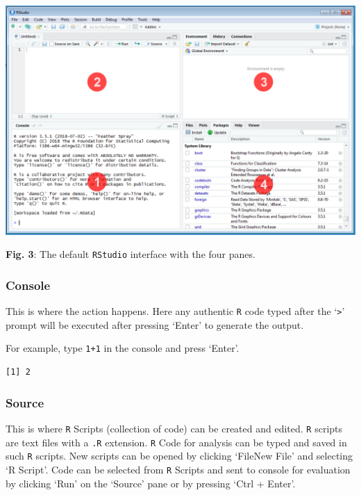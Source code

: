 \includegraphics{rstudio panes.png}

\begin{center}
                \textbf{Fig. 3}: The default \texttt{RStudio} interface with the four panes.
                \end{center}

\hypertarget{console}{%
\subsubsection{Console}\label{console}}

This is where the action happens. Here any authentic \texttt{R} code
typed after the `\texttt{\textgreater{}}' prompt will be executed after
pressing `Enter' to generate the output.

For example, type \texttt{1+1} in the console and press `Enter'.

\begin{Shaded}
\begin{Highlighting}[]
\OperatorTok{+}
\end{Highlighting}
\end{Shaded}

\begin{verbatim}
[1] 2
\end{verbatim}

\hypertarget{source}{%
\subsubsection{Source}\label{source}}

This is where \texttt{R} Scripts (collection of code) can be created and
edited. \texttt{R} scripts are text files with a \texttt{.R} extension.
\texttt{R} Code for analysis can be typed and saved in such \texttt{R}
scripts. New scripts can be opened by clicking `File\textbar{}New File'
and selecting `R Script'. Code can be selected from \texttt{R} Scripts
and sent to console for evaluation by clicking `Run' on the `Source'
pane or by pressing `Ctrl + Enter'.


